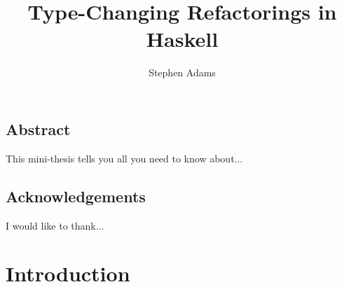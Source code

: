 

\usepackage{hyperref}

\usepackage{makeidx}



\setcounter{secnumdepth}{3} %

\def\fixme#1{\fbox{\textbf{\textsc{Fixme}}\quad#1}}
\def\fixpic#1{\fbox{\textbf{\textsc{Picture}}\quad#1}}
\def\defnx#1#2{\emph{#1}\index{#2}}
\def\defn#1{\defnx{#1}{#1}}
\def\floatpic#1#2{%
\begin{figure}
\texttt{[image: \#2]}
\end{figure}}
\def\inlinepic#1#2{%
\begin{center}
\texttt{[image: \#2]}
\end{center}}




\title{Type-Changing Refactorings in Haskell}
\author{Stephen Adams}
\subject{Computer Science}

\begin{preface}
\section{Abstract}
This mini-thesis tells you all you need to know about...
\section{Acknowledgements}
I would like to thank...
\end{preface}

\chapter{Introduction}\label{chp:intro}


